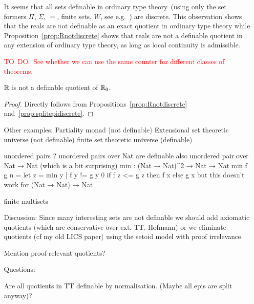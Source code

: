 \documentclass{llncs}
\newcommand{\todo}[1]{\textcolor{red}{TO~DO:~#1}}
\begin{document}
It seems that all sets definable in ordinary type theory~(using only the set formers $\Pi$, $\Sigma$, $=$, finite sets, $W$, see e.g.~\cite{Bengt, Peter Aczel}) are discrete. This observation shows that the reals are not  definable as an exact quotient in ordinary type theory while Proposition~\ref{prop:Rnotdiscrete} shows that reals are not a definable  quotient in any extension of ordinary type theory, as long as local continuity is admissible.

\todo{See whether we can use the same counter for different classes of theorems.}

\begin{corollary}
$\mathbb{R}$ is not a definable quotient of $\mathbb{R}_0$.
\end{corollary}
\begin{proof}
Directly follows from Propositions~\ref{prop:Rnotdiscrete} and~\ref{prop:splitepidiscrete}.
\end{proof}

Other examples: 
  Partiality monad (not definable)
  Extensional set theoretic universe (not definable)
  finite set theoretic universe (definable)

  unordered pairs ? 
  unordered pairs over Nat are definable
  also unordered pair over Nat → Nat
    (which is a bit surprising)
    min : (Nat → Nat)^2 → Nat → Nat
    min f g n = let z = min {y | f y != g y} 0
                        if f z <= g z then f x
                        else g x
    but this doesn't work for (Nat → Nat) → Nat

  finite multisets
  

Discussion:
  Since many interesting sets are not definable we should add
  axiomatic quotients (which are conservative over ext. TT, Hofmann)
  or we eliminate quotients (cf my old LICS paper) using the setoid
  model with proof irrelevance.

  Mention proof relevant quotients?

Questions:

  Are all quotients in TT definable by normalisation.
  (Maybe all epis are split anyway)?
\end{document}
